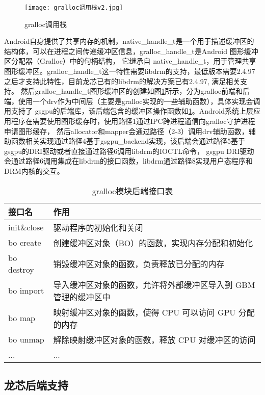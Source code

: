 \begin{figure}[h]
  \centering
  \texttt{[image: gralloc调用栈v2.jpg]}
  \caption{gralloc调用栈}
  \label{fig:gralloc调用栈}
\end{figure}

Android自身提供了共享内存的机制，native\_handle\_t是一个用于描述缓冲区的结构体，可以在进程之间传递缓冲区信息，gralloc\_handle\_t是Android 图形缓冲区分配器（Gralloc）中的句柄结构，
它继承自 native\_handle\_t，用于管理共享图形缓冲区。gralloc\_handle\_t这一特性需要libdrm的支持，最低版本需要2.4.97之后才支持此特性，目前龙芯已有的libdrm的解决方案已有2.4.97,
满足相关支持。
然后gralloc\_handle\_t图形缓冲区的创建如图\ref{fig:gralloc调用栈}所示，分为gralloc前端和后端，使用一个drv作为中间层（主要是gralloc实现的一些辅助函数），具体实现会调用支持了
gsgpu的后端库，该后端包含的缓冲区操作函数如\ref{tab:gralloc模块后端接口表}。Android系统上层应用程序在需要使用图形缓存时，使用路径1通过IPC跨进程通信向gralloc守护进程申请图形缓存，
然后allocator和mapper会通过路径（2-3）调用drv辅助函数，辅助函数相关实现通过路径4基于gsgpu\_backend实现，该后端会通过路径5基于gsgpu的DRI驱动或者直接通过路径6调用libdrm的IOCTL命令，
gsgpu DRI驱动会通过路径6调用集成在libdrm的接口函数，libdrm通过路径8实现用户态程序和DRM内核的交互。

\begin{table}[h]  
  \centering
  \caption{gralloc模块后端接口表}
  \label{tab:gralloc模块后端接口表}
  \begin{tabular}{ll}
    \toprule
    接口名  & 作用\\
    \midrule
    init\&close & 驱动程序的初始化和关闭 \\
    bo create & 创建缓冲区对象（BO）的函数，实现内存分配和初始化 \\
    bo destroy & 销毁缓冲区对象的函数，负责释放已分配的内存 \\
    bo import & 导入缓冲区对象的函数，允许将外部缓冲区导入到 GBM 管理的缓冲区中 \\
    bo map & 映射缓冲区对象的函数，使得 CPU 可以访问 GPU 分配的内存 \\
    bo unmap & 解除映射缓冲区对象的函数，释放 CPU 对缓冲区的访问 \\
    ... & ... \\
    \bottomrule
  \end{tabular}
  \note{}
\end{table}

\subsection{龙芯后端支持}

